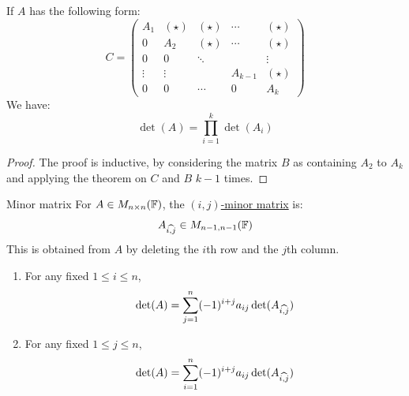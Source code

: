 \documentclass[../Main.tex]{subfiles}
\begin{document}
\begin{corollary}
    If $A$ has the following form:
    \begin{equation*}
        C =
        \begin{pmatrix}
            A_1 & (\star) & (\star) & \cdots & (\star) \\
            0 & A_2 & (\star) & \cdots & (\star) \\
            0 & 0 & \ddots & & \vdots \\
            \vdots & \vdots & & A_{k-1} & (\star) \\
            0 & 0 & \cdots & 0 & A_k
        \end{pmatrix}                
    \end{equation*}
    We have:
    \begin{equation*}
        \det(A) = \prod_{i=1}^{k} \det(A_i)
    \end{equation*}
    \label{corMultiBlockDet}
\end{corollary}
\begin{proof}
    The proof is inductive, by considering the matrix $B$ as containing $A_2$ to $A_k$ and applying the theorem on $C$ and $B$ $k-1$ times.
\end{proof}
\begin{definition}{Minor matrix}
    For $A \in M_{n \times n}(\mathbb{F})$, the \underline{$(i, j)$-minor matrix} is:
    \begin{equation*}
        {A}_{\widehat{{i},{j}}} \in M_{n-1, n-1} (\mathbb{F})
    \end{equation*}
    This is obtained from $A$ by deleting the $i$th row and the $j$th column.
\end{definition}
\begin{lemma}
    \begin{enumerate}
        \item For any fixed $1 \leq i \leq n$,
            \begin{equation*}
                \det(A) = \sum_{j=1}^{n} (-1)^{i+j} a_{ij} \det({A}_{\widehat{{i},{j}}})
            \end{equation*}
        \item For any fixed $1 \leq j \leq n$,
            \begin{equation*}
                \det(A) = \sum_{i=1}^{n} (-1)^{i+j} a_{ij} \det({A}_{\widehat{{i},{j}}})
            \end{equation*}
    \end{enumerate}
    \label{lemLaplaceOnRowCol}
\end{lemma}
\end{document}
